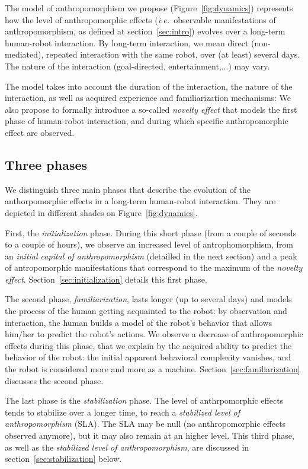 \documentclass[lettersize, apacite, twoside, HRI]{apa_HRI}
\newcommand{\ie}{{\textit{i.e.~}}}
\begin{document}
The model of anthropomorphism we propose (Figure~\ref{fig:dynamics}) represents
how the level of anthropomorphic effects (\ie observable manifestations of
anthropomorphism, as defined at section~\ref{sec:intro}) evolves over a
long-term human-robot interaction. By long-term interaction, we mean direct
(non-mediated), repeated interaction with the same robot, over (at least) several
days. The nature of the interaction (goal-directed, entertainment,...) may vary.

The model takes into account the duration of the interaction, the nature of the
interaction, as well as acquired experience and familiarization mechanisms: We
also propose to formally introduce a so-called \emph{novelty effect} that
models the first phase of human-robot interaction, and during which specific
anthropomorphic effect are observed.

\subsection{Three phases}
\label{sec:phases}

We distinguish three main phases that describe the evolution of the
anthorpomorphic effects in a long-term human-robot interaction. They are
depicted in different shades on Figure~\ref{fig:dynamics}.

First, the \emph{initialization} phase. During this short phase (from a couple
of seconds to a couple of hours), we observe an increased level of
antrophomorphism, from an \emph{initial capital of anthropomorphism}
(detailled in the next section) and a peak of antropomorphic manifestations
that correspond to the maximum of the \emph{novelty effect}.
Section~\ref{sec:initialization} details this first phase.

The second phase, \emph{familiarization}, lasts longer (up to several days) and
models the process of the human getting acquainted to the robot: by observation
and interaction, the human builds a model of the robot's behavior that allows
him/her to predict the robot's actions. We observe a decrease of
anthropomorphic effects during this phase, that we explain by the acquired
ability to predict the behavior of the robot: the initial apparent behavioral
complexity vanishes, and the robot is considered more and more as a machine.
Section~\ref{sec:familiarization} discusses the second phase.

The last phase is the \emph{stabilization} phase. The level of anthrpomorphic
effects tends to stabilize over a longer time, to reach a \emph{stabilized
level of anthropomorphism} (SLA). The SLA may be null (no anthropomorphic
effects observed anymore), but it may also remain at an higher level.  This
third phase, as well as the \emph{stabilized level of anthropomorphism}, are
discussed in section~\ref{sec:stabilization} below.
\end{document}
